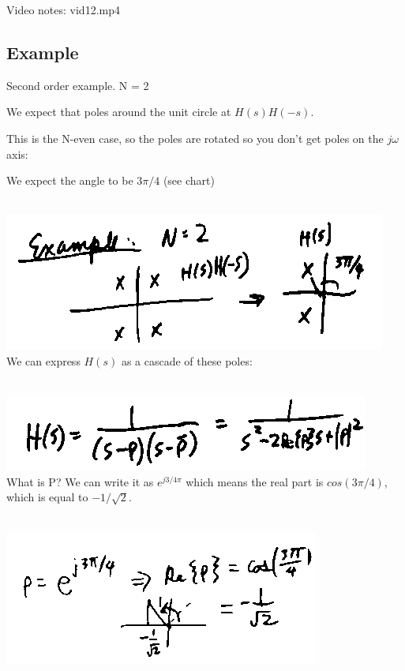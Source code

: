 Video notes: vid12.mp4

\subsection*{Example}
Second order example.  N = 2

We expect that poles around the unit circle at $H(s)H(-s)$.

This is the N-even case, so the poles are rotated so you don't get 
poles on the $j\omega$ axis:

We expect the angle to be $3\pi/4$ (see chart)

\\
\includegraphics[scale=0.5]{frames/17a}\\

We can express $H(s)$ as a cascade of these poles:


\\
\includegraphics[scale=0.5]{frames/17b}\\

What is P? We can write it as $e^{j3/4\pi}$ which means the real part is
$cos(3\pi/4)$, which is equal to $-1/\sqrt{2}$. 

\\
\includegraphics[scale=0.5]{frames/17c}\\

